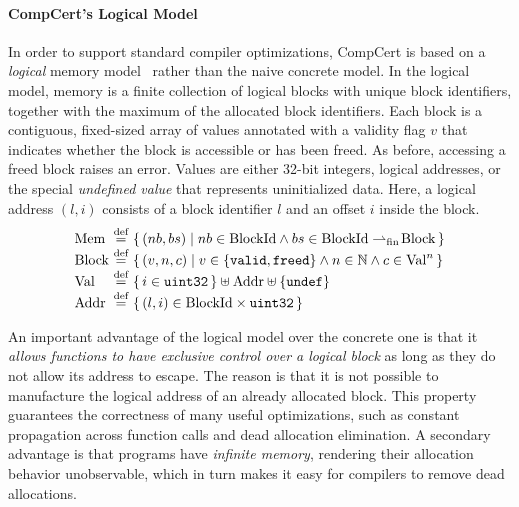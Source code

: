%



\paragraph{CompCert's Logical Model}

In order to support standard compiler optimizations, CompCert is based on a \emph{logical} memory
model~\cite{leroy:compcert,Leroy-Appel-Blazy-Stewart-memory-v2} rather than the naive concrete
model.  In the logical model, memory is a finite collection of logical blocks with unique block
identifiers, together with the maximum of the allocated block identifiers.  Each block is a
contiguous, fixed-sized array of values annotated with a validity flag $v$ that indicates whether
the block is accessible or has been freed. As before, accessing a freed block raises an error.
Values are either 32-bit integers, logical addresses, or the special \emph{undefined value} that
represents uninitialized data.  Here, a logical address $(l,i)$ consists of a block identifier $l$
and an offset $i$ inside the block.
\[
\begin{array}{@{}l@{~}c@{~}l@{}}
\rtlMem &\defeq& \setof{(nb,bs)\suchthat nb\in\rtlBId\land bs \in \rtlBId \fpfun \rtlBlock} \\
\rtlBlock &\defeq&
\setof{(v, n, c) \suchthat
  v \in \setofz{\rtlvalid,\rtlfreed} \land n \in \Nat \land c \in \rtlVal^n } \\
\rtlVal &\defeq& \setof{i\in\usize} \uplus \rtlAddr \uplus \setofz{\rtlundef} \\
\rtlAddr &\defeq& \setof{(l,i) \in \rtlBId\times \usize}
\end{array}
\]

An important advantage of the logical model over the concrete one is that 
it \emph{allows functions to have exclusive control over a logical block} as 
long as they do not allow its address to escape. The reason is that it
is not possible to manufacture the logical address of an already allocated block.  
This property guarantees the correctness of many useful optimizations, 
such as constant propagation across function calls and dead allocation
elimination.
A secondary advantage is that programs have \emph{infinite memory}, rendering
their allocation behavior unobservable, which in turn makes it easy for
compilers to remove dead allocations.

